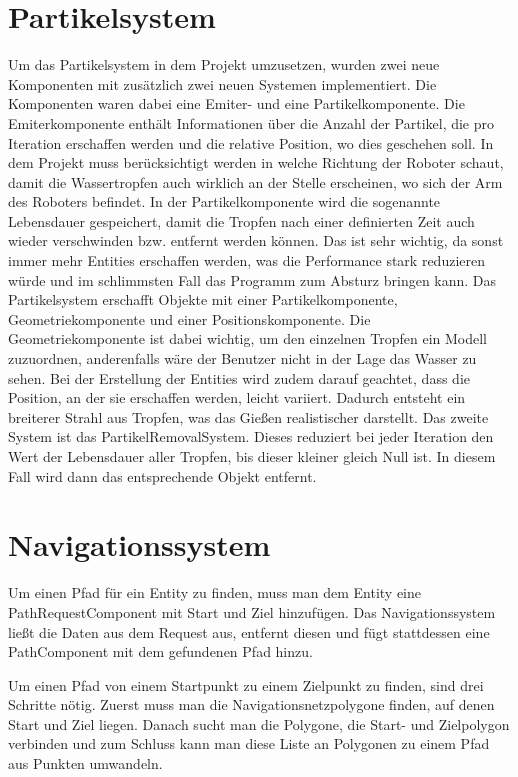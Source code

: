 \section{Partikelsystem}
Um das Partikelsystem in dem Projekt umzusetzen, wurden zwei neue Komponenten mit zusätzlich zwei neuen Systemen implementiert. Die Komponenten waren dabei eine Emiter- und eine Partikelkomponente. Die Emiterkomponente enthält Informationen über die Anzahl der Partikel, die pro Iteration erschaffen werden und die relative Position, wo dies geschehen soll. In dem Projekt muss berücksichtigt werden in welche Richtung der Roboter schaut, damit die Wassertropfen auch wirklich an der Stelle erscheinen, wo sich der Arm des Roboters befindet. In der Partikelkomponente wird die sogenannte Lebensdauer gespeichert, damit die Tropfen nach einer definierten Zeit auch wieder verschwinden bzw. entfernt werden können. Das ist sehr wichtig, da sonst immer mehr Entities erschaffen werden, was die Performance stark reduzieren würde und im schlimmsten Fall das Programm zum Absturz bringen kann. Das Partikelsystem erschafft Objekte mit einer Partikelkomponente, Geometriekomponente und einer Positionskomponente. Die Geometriekomponente ist dabei wichtig, um den einzelnen Tropfen ein Modell zuzuordnen, anderenfalls wäre der Benutzer nicht in der Lage das Wasser zu sehen. Bei der Erstellung der Entities wird zudem darauf geachtet, dass die Position, an der sie erschaffen werden, leicht variiert. Dadurch entsteht ein breiterer Strahl aus Tropfen, was das Gießen realistischer darstellt. Das zweite System ist das PartikelRemovalSystem. Dieses reduziert bei jeder Iteration den Wert der Lebensdauer aller Tropfen, bis dieser kleiner gleich Null ist. In diesem Fall wird dann das entsprechende Objekt entfernt. 
\section{Navigationssystem}

Um einen Pfad für ein Entity zu finden, muss man dem Entity eine PathRequestComponent mit Start und Ziel hinzufügen. Das Navigationssystem ließt die Daten aus dem Request aus, entfernt diesen und fügt stattdessen eine PathComponent mit dem gefundenen Pfad hinzu.

Um einen Pfad von einem Startpunkt zu einem Zielpunkt zu finden, sind drei Schritte nötig. Zuerst muss man die Navigationsnetzpolygone finden, auf denen Start und Ziel liegen. Danach sucht man die Polygone, die Start- und Zielpolygon verbinden und zum Schluss kann man diese Liste an Polygonen zu einem Pfad aus Punkten umwandeln.


